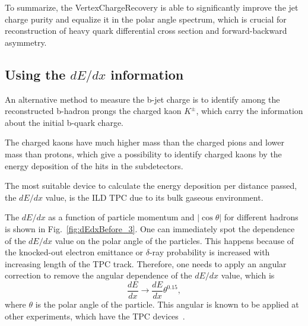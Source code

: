 To summarize, the VertexChargeRecovery is able to significantly improve the jet charge purity and equalize it in the polar angle spectrum, which is crucial for reconstruction of heavy quark differential cross section and forward-backward asymmetry. 
\subsection{Using the $dE/dx$ information}

An alternative method to measure the b-jet charge is to identify among the reconstructed b-hadron prongs the charged kaon $K^\pm$, which carry the information about the initial b-quark charge. 

The charged kaons have much higher mass than the charged pions and lower mass than protons, which give a possibility to identify charged kaons by the energy deposition of the hits in the subdetectors. 

The most suitable device to calculate the energy deposition per distance passed, the $dE/dx$ value, is the ILD TPC due to its bulk gaseous environment. 


The $dE/dx$ as a function of particle momentum and $|\cos\theta|$ for different hadrons is shown in Fig.~\ref{fig:dEdxBefore_3}. One can immediately spot the dependence of the $dE/dx$ value on the polar angle of the particles. This happens because of the knocked-out electron emittance or $\delta$-ray probability is increased with increasing length of the TPC track. Therefore, one needs to apply an angular correction to remove the angular dependence of the $dE/dx$ value, which is 
\begin{equation}
	\frac{dE}{dx}\to\frac{dE}{dx}\theta^{0.15},
    \label{formula:dEdxCorrection}
\end{equation}
where $\theta$ is the polar angle of the particle. 
This angular is known to be applied at other experiments, which have the TPC devices~\cite{bib:HARP}.

